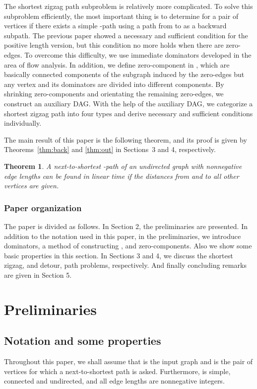 \documentclass[review]{elsarticle}
\newtheorem{thm}{Theorem}
\begin{document}
The shortest zigzag path subproblem is relatively more complicated.
To solve this subproblem efficiently, the most important thing is to
determine for a pair of vertices  if there exists a simple
-path using a path from  to  as a backward subpath. The
previous paper \cite{wu10} showed a necessary and sufficient
condition for the positive length version, but this condition no
more holds when there are zero-edges. To overcome this difficulty,
we use immediate dominators developed in the area of flow analysis.
In addition, we define zero-component in , which are basically
connected components of the subgraph induced by the zero-edges but
any vertex and its dominators are divided into different components.
By shrinking zero-components and orientating the remaining
zero-edges, we construct an auxiliary DAG. With the help of the
auxiliary DAG, we categorize a shortest zigzag path into four types
and derive necessary and sufficient conditions individually.

The main result of this paper is the following theorem, and its
proof is given by Theorems~\ref{thm:back} and \ref{thm:out} in
Sections~3 and 4, respectively.
\begin{thm}\label{thm:main}
A next-to-shortest -path of an undirected graph with nonnegative
edge lengths can be found in linear time if the distances from 
and  to all other vertices are given.
\end{thm}

\subsubsection*{Paper organization}
The paper is divided as follows. In Section 2, the preliminaries are
presented. In addition to the notation used in this paper, in the
preliminaries, we introduce dominators, a method of constructing
, and zero-components. Also we show some basic properties in
this section. In Sections 3 and 4, we discuss the shortest zigzag,
and detour, path problems, respectively. And finally concluding
remarks are given in Section 5.

\section{Preliminaries}
\subsection{Notation and some properties}
Throughout this paper, we shall assume that  is the input graph
and  is the pair of vertices for which a next-to-shortest
path is asked. Furthermore,  is simple, connected and undirected,
and all edge lengths are nonnegative integers.
\end{document}
